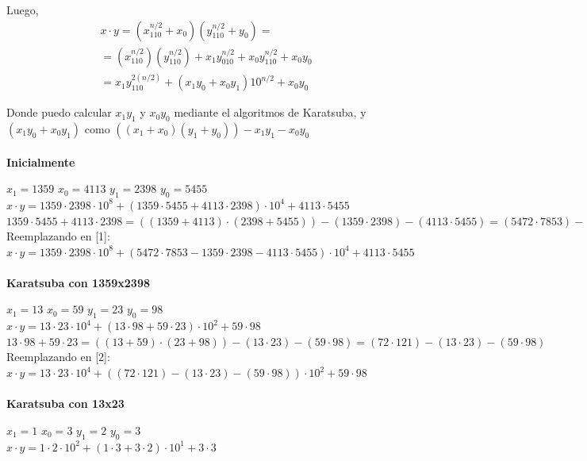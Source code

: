 \documentclass[titlepage,a4paper]{article}
\begin{document}
Luego, 
\begin{gather*}
    x\cdot y=(x_110^{n/2}+x_0)(y_110^{n/2}+y_0)=  \\
=(x_110^{n/2})(y_110^{n/2})+x_1y_010^{n/2}+x_0y_110^{n/2}+x_0y_0 \\
=x_1y_110^{2(n/2)}+(x_1y_0+x_0y_1)10^{n/2}+x_0y_0 
\end{gather*}

Donde puedo calcular $x_1y_1$ y $x_0y_0$ mediante el algoritmos de Karatsuba, y $(x_1y_0+x_0y_1)$ como $((x_1+x_0)(y_1+y_0))-x_1y_1-x_0y_0$  \\ \\


\textbf{Inicialmente} \par
\qquad $x_1=1359$ \quad $x_0=4113$ \quad $y_1=2398$ \quad $y_0=5455$ \\
$x\cdot y= 1359 \cdot 2398 \cdot 10^8 + (1359\cdot 5455 + 4113 \cdot 2398)\cdot 10^4 + 4113\cdot 5455$ \qquad [1]\\

$1359 \cdot5455 + 4113\cdot2398 = ((1359+4113)\cdot (2398+5455)) - (1359\cdot 2398) - (4113\cdot 5455) = (5472\cdot7853) - (1359\cdot 2398) - (4113\cdot 5455) $ \\

Reemplazando en [1]: \qquad $ x\cdot y= 1359 \cdot 2398 \cdot 10^8 + ( 5472\cdot7853 - 1359\cdot 2398 - 4113\cdot 5455)\cdot 10^4 + 4113\cdot 5455 $ \\ \\





\textbf{Karatsuba con  1359x2398} \par
\qquad $x_1=13$ \quad $x_0=59$ \quad $y_1=23$ \quad $y_0=98$ \\
$x\cdot y= 13 \cdot 23 \cdot 10^4 + (13\cdot 98 + 59 \cdot 23)\cdot 10^2 + 59\cdot 98$ \qquad [2] \\ 

$13\cdot 98 + 59 \cdot 23 = ((13+59)\cdot (23+98)) - (13\cdot 23) - (59\cdot 98) = (72 \cdot 121) - (13\cdot 23) - (59\cdot 98) $ \\

Reemplazando en [2]: \qquad $ x\cdot y= 13 \cdot 23 \cdot 10^4 + ((72 \cdot 121) - (13\cdot 23) - (59\cdot 98))\cdot 10^2 + 59\cdot 98 $ \\ \\ 


\textbf{Karatsuba con 13x23} \par
\qquad $x_1=1$ \quad $x_0=3$ \quad $y_1=2$ \quad $y_0=3$ \\
$x\cdot y= 1 \cdot 2 \cdot 10^2 + (1\cdot 3 + 3 \cdot 2)\cdot 10^1 + 3\cdot 3$ \\
\end{document}
